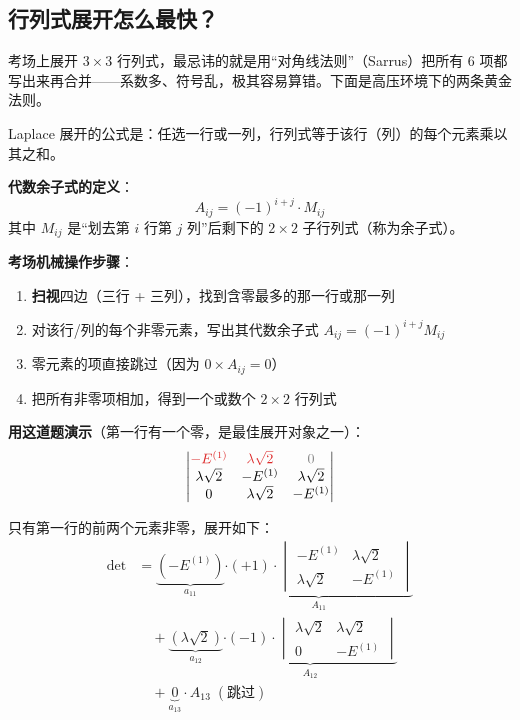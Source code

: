 \subsection{行列式展开怎么最快？}

考场上展开 $3 \times 3$ 行列式，最忌讳的就是用``对角线法则''（Sarrus）把所有 6 项都写出来再合并——系数多、符号乱，极其容易算错。下面是高压环境下的两条黄金法则。

\begin{tipbox}
Laplace 展开的公式是：任选一行或一列，行列式等于该行（列）的每个元素乘以其之和。

\textbf{代数余子式的定义}：
\[
A_{ij} = (-1)^{i+j} \cdot M_{ij}
\]
其中 $M_{ij}$ 是``划去第 $i$ 行第 $j$ 列''后剩下的 $2 \times 2$ 子行列式（称为余子式）。

\textbf{考场机械操作步骤}：
\begin{enumerate}[nosep]
    \item \textbf{扫视}四边（三行 + 三列），找到含零最多的那一行或那一列
    \item 对该行/列的每个非零元素，写出其代数余子式 $A_{ij} = (-1)^{i+j} M_{ij}$
    \item 零元素的项直接跳过（因为 $0 \times A_{ij} = 0$）
    \item 把所有非零项相加，得到一个或数个 $2 \times 2$ 行列式
\end{enumerate}

\textbf{用这道题演示}（第一行有一个零，是最佳展开对象之一）：
\[
\begin{vmatrix}
\textcolor{alertred}{-E^{(1)}} & \textcolor{alertred}{\lambda\sqrt{2}} & \textcolor{gray}{0} \\
\lambda\sqrt{2} & -E^{(1)} & \lambda\sqrt{2} \\
0 & \lambda\sqrt{2} & -E^{(1)}
\end{vmatrix}
\]

只有第一行的前两个元素非零，展开如下：
\begin{align*}
\det &= \underbrace{(-E^{(1)})}_{a_{11}} \underbrace{\cdot (+1) \cdot \begin{vmatrix} -E^{(1)} & \lambda\sqrt{2} \\ \lambda\sqrt{2} & -E^{(1)} \end{vmatrix}}_{A_{11}} \\
&\quad + \underbrace{(\lambda\sqrt{2})}_{a_{12}} \underbrace{\cdot (-1) \cdot \begin{vmatrix} \lambda\sqrt{2} & \lambda\sqrt{2} \\ 0 & -E^{(1)} \end{vmatrix}}_{A_{12}} \\
&\quad + \underbrace{0}_{a_{13}} \cdot A_{13} \; (\text{跳过})
\end{align*}


\end{tipbox}
